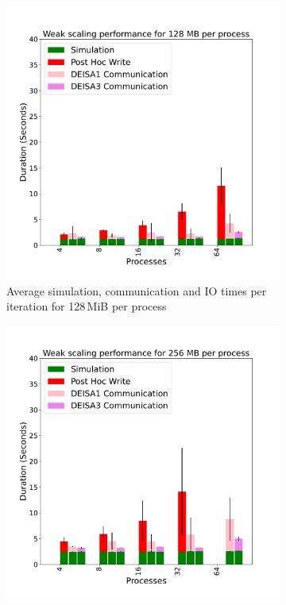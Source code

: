 \begin{figure}
     \centering
     \begin{subfigure}[b]{0.3\textwidth}
         \centering
         \includegraphics[width=\textwidth, height=\textwidth]{figures/128MB_1vs3vspost1vspost2.pdf}
         \caption{Average simulation, communication and IO times per iteration for 128\,MiB per process}
         \label{fig:X1128_1_3_p}
     \end{subfigure}
     \hfill
     \begin{subfigure}[b]{0.3\textwidth}
         \centering
         \includegraphics[width=\textwidth, height=\textwidth]{figures/256MB_1vs3vspost1vspost2.pdf}

\end{subfigure}
\end{figure}

